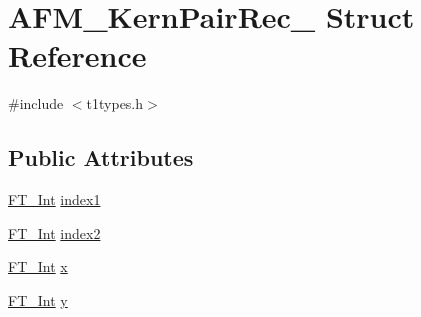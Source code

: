\hypertarget{struct_a_f_m___kern_pair_rec__}{\section{A\-F\-M\-\_\-\-Kern\-Pair\-Rec\-\_\- Struct Reference}
\label{struct_a_f_m___kern_pair_rec__}
}


{\ttfamily \#include $<$t1types.\-h$>$}

\subsection*{Public Attributes}
\begin{DoxyCompactItemize}
\item 
\hyperlink{fttypes_8h_af90e5fb0d07e21be9fe6faa33f02484c}{F\-T\-\_\-\-Int} \hyperlink{struct_a_f_m___kern_pair_rec___a732bca56dd4a070b1d887ada1637e810}{index1}
\item 
\hyperlink{fttypes_8h_af90e5fb0d07e21be9fe6faa33f02484c}{F\-T\-\_\-\-Int} \hyperlink{struct_a_f_m___kern_pair_rec___aee548123779323c255180112c7f5b831}{index2}
\item 
\hyperlink{fttypes_8h_af90e5fb0d07e21be9fe6faa33f02484c}{F\-T\-\_\-\-Int} \hyperlink{struct_a_f_m___kern_pair_rec___a4b7f90a0e17ed89353fec14ddb29fa12}{x}
\item 
\hyperlink{fttypes_8h_af90e5fb0d07e21be9fe6faa33f02484c}{F\-T\-\_\-\-Int} \hyperlink{struct_a_f_m___kern_pair_rec___aa177aa612e79701261eba72c76ea3f08}{y}
\end{DoxyCompactItemize}


